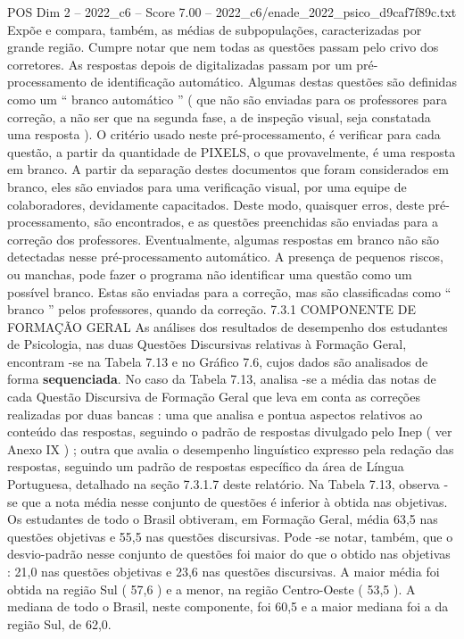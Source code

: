 \begin{textsample}{POS Dim 2 – 2022\_c6 – Score 7.00 – 2022\_c6/enade\_2022\_psico\_d9caf7f89c.txt}
Expõe e compara, também, as médias de subpopulações, caracterizadas por grande região.
Cumpre notar que nem todas as questões passam pelo crivo dos corretores.
As respostas depois de digitalizadas passam por um pré-processamento de identificação automático.
Algumas destas questões são definidas como um “ branco automático ” ( que não são enviadas para os professores para correção, a não ser que na segunda fase, a de inspeção visual, seja constatada uma resposta ).
O critério usado neste pré-processamento, é verificar para cada questão, a partir da quantidade de PIXELS, o que provavelmente, é uma resposta em branco.
A partir da separação destes documentos que foram considerados em branco, eles são enviados para uma verificação visual, por uma equipe de colaboradores, devidamente capacitados.
Deste modo, quaisquer erros, deste pré-processamento, são encontrados, e as questões preenchidas são enviadas para a correção dos professores.
Eventualmente, algumas respostas em branco não são detectadas nesse pré-processamento automático.
A presença de pequenos riscos, ou manchas, pode fazer o programa não identificar uma questão como um possível branco.
Estas são enviadas para a correção, mas são classificadas como “ branco ” pelos professores, quando da correção. 7.3.1 COMPONENTE DE FORMAÇÃO GERAL As análises dos resultados de desempenho dos estudantes de Psicologia, nas duas Questões Discursivas relativas à Formação Geral, encontram -se na Tabela 7.13 e no Gráfico 7.6, cujos dados são analisados de forma \textbf{sequenciada}.
No caso da Tabela 7.13, analisa -se a média das notas de cada Questão Discursiva de Formação Geral que leva em conta as correções realizadas por duas bancas : uma que analisa e pontua aspectos relativos ao conteúdo das respostas, seguindo o padrão de respostas divulgado pelo Inep ( ver Anexo IX ) ; outra que avalia o desempenho linguístico expresso pela redação das respostas, seguindo um padrão de respostas específico da área de Língua Portuguesa, detalhado na seção 7.3.1.7 deste relatório.
Na Tabela 7.13, observa -se que a nota média nesse conjunto de questões é inferior à obtida nas objetivas.
Os estudantes de todo o Brasil obtiveram, em Formação Geral, média 63,5 nas questões objetivas e 55,5 nas questões discursivas.
Pode -se notar, também, que o desvio-padrão nesse conjunto de questões foi maior do que o obtido nas objetivas : 21,0 nas questões objetivas e 23,6 nas questões discursivas.
A maior média foi obtida na região Sul ( 57,6 ) e a menor, na região Centro-Oeste ( 53,5 ).
A mediana de todo o Brasil, neste componente, foi 60,5 e a maior mediana foi a da região Sul, de 62,0.

\end{textsample}
